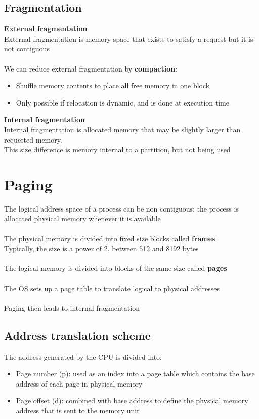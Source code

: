 \documentclass{article}[18pt]
\begin{document}
\subsection{Fragmentation}
\textbf{External fragmentation}\\
External fragmentation is memory space that exists to satisfy a request but it is not contiguous\\
\\
We can reduce external fragmentation by \textbf{compaction}:
\begin{itemize}
	\item Shuffle memory contents to place all free memory in one block
	\item Only possible if relocation is dynamic, and is done at execution time
\end{itemize}
\textbf{Internal fragmentation}\\
Internal fragmentation is allocated memory that may be slightly larger than requested memory.\\
This size difference is memory internal to a partition, but not being used
\section{Paging}
The logical address space of a process can be non contiguous: the process is allocated physical memory whenever it is available\\
\\
The physical memory is divided into fixed size blocks called \textbf{frames}\\
Typically, the size is a power of 2, between 512 and 8192 bytes\\
\\
The logical memory is divided into blocks of the same size called \textbf{pages}\\
\\
The OS sets up a page table to translate logical to physical addresses\\
\\
Paging then leads to internal fragmentation
\subsection{Address translation scheme}
The address generated by the CPU is divided into:
\begin{itemize}
	\item Page number (p): used as an index into a page table which contains the base address of each page in physical memory
	\item Page offset (d): combined with base address to define the physical memory address that is sent to the memory unit
\end{itemize}
\end{document}

